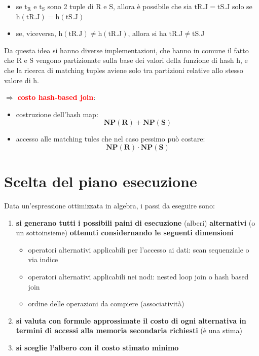 \begin{itemize}[label=$\circ$, itemsep=\smallskipamount]
    \item se $\mathrm{t_R}$ e $\mathrm{t_S}$ sono 2 tuple di $\mathrm{R}$ e $\mathrm{S}$, allora è possibile che sia $\mathrm{tR.J = tS.J}$ solo se $\mathrm{h(tR.J) = h(tS.J)}$
    \item se, viceversa, $\mathrm{h(tR.J) \neq h(tR.J)}$, allora si ha $\mathrm{tR.J \neq tS.J}$
\end{itemize}

Da questa idea si hanno diverse implementazioni, che hanno in comune il fatto che $\mathrm{R}$ e $\mathrm{S}$ vengono partizionate sulla base dei valori della funzione di hash $\mathrm{h}$, e che la ricerca di matching tuples aviene solo tra partizioni relative allo stesso valore di $\mathrm{h}$.

$\Rightarrow$ \textcolor{red}{\textbf{costo hash-based join}}:
\begin{itemize}[label=$\circ$, itemsep=\smallskipamount]
    \item costruzione dell'hash map:
    \[
        \mathbf{NP(R) + NP(S)}
    \]
    \item accesso alle matching tules che nel caso pessimo può costare:
    \[
       \mathbf{ NP(R) \cdot NP(S)}
    \]
\end{itemize}

\section{Scelta del piano esecuzione}
Data un'espressione ottimizzata in algebra, i passi da eseguire sono:
\begin{enumerate}[itemsep=\smallskipamount]
    \item \textbf{si generano tutti i possibili paini di esecuzione} (alberi) \textbf{alternativi} (o un sottoinsieme) \textbf{ottenuti considernando le seguenti dimensioni}
    \begin{itemize}[label=$\circ$, itemsep=\smallskipamount]
        \item operatori alternativi applicabili per l'accesso ai dati: scan sequenziale o via indice
        \item operatori alternativi applicabili nei nodi: nested loop join o hash based join
        \item ordine delle operazioni da compiere (associatività)
    \end{itemize}
    \item \textbf{si valuta con formule approssimate il costo di ogni alternativa in termini di accessi alla memoria secondaria richiesti} (è una stima)
    \item \textbf{si sceglie l'albero con il costo stimato minimo}
\end{enumerate}

